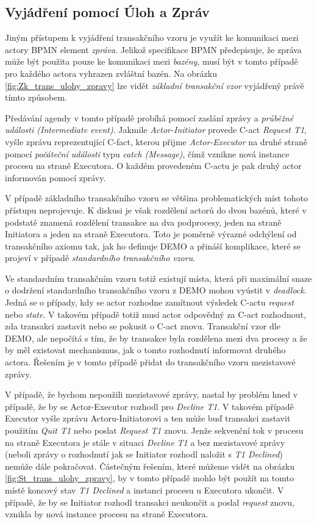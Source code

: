 \subsection{Vyjádření pomocí Úloh a Zpráv} \label{sec:tr_vzor_ulohy_zpravy}
Jiným přístupem k vyjádření transakčního vzoru je využít ke komunikaci mezi actory BPMN element \textit{zpráva}. Jelikož specifikace BPMN předepisuje, že zpráva může být použita pouze ke komunikaci mezi \textit{bazény}, musí být v tomto případě pro každého actora vyhrazen zvláštní bazén. Na obrázku \ref{fig:Zk_trans_ulohy_zpravy} lze vidět \textit{základní transakční vzor} vyjádřený právě tímto způsobem.

Předávání agendy v tomto případě probíhá pomocí zaslání zprávy a  \textit{průběžné události (Intermediate event)}. Jakmile \textit{Actor-Initiator} provede C-act \textit{Request T1}, vyšle zprávu reprezentující C-fact, kterou přijme \textit{Actor-Executor} na druhé straně pomocí \textit{počáteční události} typu \textit{catch (Message)}, čímž vznikne nová instance procesu na straně Executora. O každém provedeném C-actu je pak druhý actor informován pomocí zprávy. 

V případě základního transakčního vzoru se většina problematických míst tohoto přístupu neprojevuje. K diskusi je však rozdělení actorů do dvou bazénů, které v podstatě znamená rozdělení transakce na dva podprocesy, jeden na straně Initiatora a jeden na straně Executora. Toto je poměrně výrazné odchýlení od transakčního axiomu tak, jak ho definuje DEMO a přináší komplikace, které se projeví v případě \textit{standardního transakčního vzoru}.

Ve standardním transakčním vzoru totiž existují místa, která při maximální snaze o dodržení standardního transakčního vzoru z DEMO mohou vyústit v \textit{deadlock}. Jedná se o případy, kdy se actor rozhodne zamítnout výsledek C-actu \textit{request} nebo \textit{state}. V takovém případě totiž musí actor odpovědný za C-act rozhodnout, zda transakci zastavit nebo se pokusit o C-act znovu. Transakční vzor dle DEMO, ale nepočítá s tím, že by transakce byla rozdělena mezi dva procesy a že by měl existovat mechanismus, jak o tomto rozhodnutí informovat druhého actora. Řešením je v tomto případě přidat do transakčního vzoru mezistavové zprávy.

V případě, že bychom nepoužili mezistavové zprávy, nastal by problém hned v případě, že by se Actor-Executor rozhodl pro \textit{Decline T1}. V takovém případě Executor vyšle zprávu Actoru-Initiatorovi a ten může buď transakci zastavit použitím \textit{Quit T1} nebo poslat \textit{Request T1} znovu. Jenže sekvenční tok v procesu na straně Executora je stále v situaci \textit{Decline T1} a bez mezistavové zprávy (neboli zprávy o rozhodnutí jak se Initiator rozhodl naložit s \textit{T1 Declined}) nemůže dále pokračovat. Částečným řešením, které můžeme vidět na obrázku \ref{fig:St_trans_ulohy_zpravy}, by v tomto případě mohlo být použít na tomto místě koncový stav \textit{T1 Declined} a instanci procesu u Executora ukončit. V případě, že by se Initiator rozhodl transakci neukončit a poslal \textit{request} znovu, vznikla by nová instance procesu na straně Executora.


